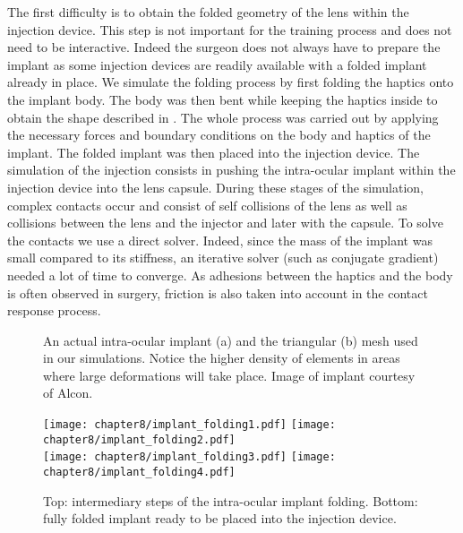 The first difficulty is to obtain the folded geometry of the lens within the injection device. This step is not important for the training process and does not need to be interactive. Indeed the surgeon does not always have to prepare the implant as some injection devices are readily available with a folded implant already in place. We simulate the folding process by first folding the haptics onto the implant body. The body was then bent while keeping the haptics inside to obtain the shape described in . The whole process was carried out by applying the necessary forces and boundary conditions on the body and haptics of the implant. The folded implant was then placed into the injection device. The simulation of the injection consists in pushing the intra-ocular implant within the injection device into the lens capsule. During these stages of the simulation, complex contacts occur and consist of self collisions of the lens as well as collisions between the lens and the injector and later with the capsule. To solve the contacts we use a direct solver. Indeed, since the mass of the implant was small compared to its stiffness, an iterative solver (such as conjugate gradient) needed a lot of time to converge. As adhesions between the haptics and the body is often observed in surgery, friction is also taken into account in the contact response process.
%
\begin{figure}[ht]
\centering 
{}
\hspace{1cm} 
\caption [Lens implant and its mesh] {An actual intra-ocular implant (a) and the triangular (b) mesh used in our simulations. Notice the higher density of elements in areas where large deformations will take place. Image of implant courtesy of Alcon.}
\label{chap8:fig-mesh}
\end{figure}

\begin{figure}[ht]
\centering
\texttt{[image: chapter8/implant\_folding1.pdf]}
\texttt{[image: chapter8/implant\_folding2.pdf]} \\
\texttt{[image: chapter8/implant\_folding3.pdf]}
\texttt{[image: chapter8/implant\_folding4.pdf]}
\caption [Folding of intra-ocular implant] {Top: intermediary steps of the intra-ocular implant folding. Bottom: fully folded implant ready to be placed into the injection device.}
\label{chap8:fig-implantFolding}
\end{figure}

